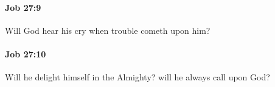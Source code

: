 		\paragraph{Job 27:9} %
			\label{JOB-27-9}

			Will God hear his cry when trouble cometh upon him?


		\paragraph{Job 27:10} %
			\label{JOB-27-10}

			Will he delight himself in the Almighty? will he always call upon God?


